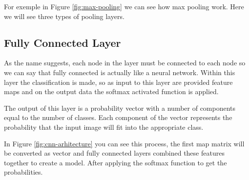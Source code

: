 For exemple in Figure \ref{fig:max-pooling} we can see how max pooling work.
Here we will see three types of pooling layers.



\subsection{Fully Connected Layer}

As the name suggests, each node in the layer must be connected to 
each node so we can say that fully connected is actually like a neural network.
Within this layer the classification is made, so as input to this layer are provided feature maps 
and on the output data the softmax activated function is applied.

The output of this layer is a probability vector with a number of components equal to the number of classes.
Each component of the vector represents
the probability that the input image will fit into the appropriate class.

In Figure \ref{fig:cnn-arhitecture} you can see this process, 
the first map matrix will be converted as vector and fully connected layers combined these features together to create a model.
After applying the softmax function to get the probabilities. 